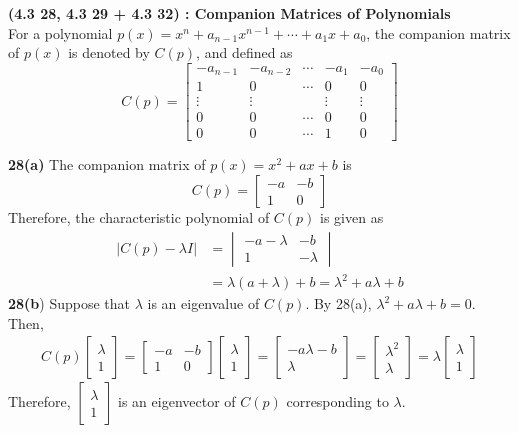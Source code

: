 \textbf{(4.3 28, 4.3 29 + 4.3 32) : Companion Matrices of Polynomials} \\
For a polynomial $p(x) = x^n + a_{n-1}x^{n-1} + \cdots + a_1x + a_0$, the companion matrix of $p(x)$ is denoted by $C(p)$, and defined as \begin{equation*}
	C(p) = \begin{bmatrix}
		-a_{n-1} & -a_{n-2} & \cdots & -a_1 & -a_0 \\
		1 & 0 & \cdots & 0 & 0 \\
		\vdots & \vdots & & \vdots & \vdots \\
		0 & 0 & \cdots & 0 & 0 \\
		0 & 0 & \cdots & 1 & 0
	\end{bmatrix}
\end{equation*}

\textbf{28(a)} The companion matrix of $p(x) = x^2 + ax + b$ is \begin{equation*}
	C(p) = \begin{bmatrix}
		-a & -b \\ 1 & 0
	\end{bmatrix}
\end{equation*} Therefore, the characteristic polynomial of $C(p)$ is given as \begin{align*}
	\vert C(p) - \lambda I \vert &= \begin{vmatrix}
		-a-\lambda & -b \\ 1 & -\lambda
	\end{vmatrix} \\
	&= \lambda(a + \lambda) + b = \lambda^2 + a\lambda + b
\end{align*}
\textbf{28(b}) Suppose that $\lambda$ is an eigenvalue of $C(p)$. By 28(a), $\lambda^2 + a\lambda + b = 0$. Then, \begin{align*}
	C(p)\begin{bmatrix}
		\lambda \\ 1
	\end{bmatrix} = \begin{bmatrix}
		-a & -b \\ 1 & 0
	\end{bmatrix}\begin{bmatrix}
		\lambda \\ 1
	\end{bmatrix} = \begin{bmatrix}
		-a\lambda -b \\ \lambda
	\end{bmatrix} = \begin{bmatrix}
		\lambda^2 \\ \lambda
	\end{bmatrix} = \lambda \begin{bmatrix}
		\lambda \\ 1
	\end{bmatrix}
\end{align*}
Therefore, $\begin{bmatrix}
	\lambda \\ 1
\end{bmatrix}$ is an eigenvector of $C(p)$ corresponding to $\lambda$. \\

